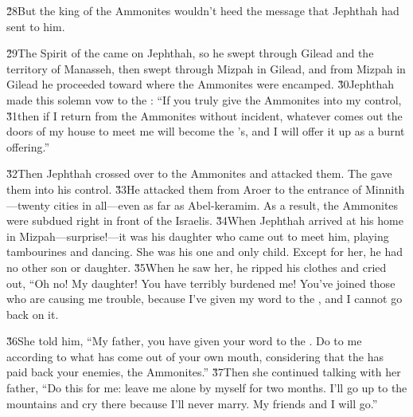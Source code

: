 \v{28}But the king of the Ammonites wouldn't heed the message that Jephthah had sent to him.

\v{29}The Spirit of the  came on Jephthah, so he swept through Gilead and the territory of Manasseh, then swept through Mizpah in Gilead, and from Mizpah in Gilead he proceeded toward where the Ammonites were encamped. \v{30}Jephthah made this solemn vow to the : ``If you truly give the Ammonites into my control, \v{31}then if I return from the Ammonites without incident, whatever comes out the doors of my house to meet me will become the 's, and I will offer it up as a burnt offering.''

\v{32}Then Jephthah crossed over to the Ammonites and attacked them. The  gave them into his control. \v{33}He attacked them from Aroer to the entrance of Minnith---twenty cities in all---even as far as Abel-keramim. As a result, the Ammonites were subdued right in front of the Israelis. \v{34}When Jephthah arrived at his home in Mizpah---surprise!---it was his daughter who came out to meet him, playing tambourines and dancing. She was his one and only child. Except for her, he had no other son or daughter. \v{35}When he saw her, he ripped his clothes and cried out, ``Oh no! My daughter! You have terribly burdened me! You've joined those who are causing me trouble, because I've given my word to the , and I cannot go back on it.

\v{36}She told him, ``My father, you have given your word to the . Do to me according to what has come out of your own mouth, considering that the  has paid back your enemies, the Ammonites.'' \v{37}Then she continued talking with her father, ``Do this for me: leave me alone by myself for two months. I'll go up to the mountains and cry there because I'll never marry. My friends and I will go.''

